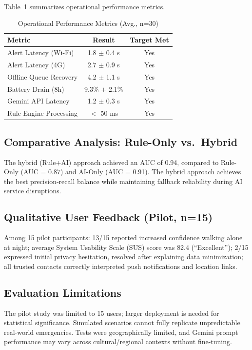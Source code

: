 Table~\ref{tab:performance} summarizes operational performance metrics.

\begin{table}[htbp]
\caption{Operational Performance Metrics (Avg., n=30)}
\label{tab:performance}
\centering
\scriptsize
\begin{tabular}{|l|c|c|}
\hline
\textbf{Metric} & \textbf{Result} & \textbf{Target Met} \\
\hline
Alert Latency (Wi-Fi) & 1.8 $\pm$ 0.4 s & Yes \\
\hline
Alert Latency (4G) & 2.7 $\pm$ 0.9 s & Yes \\
\hline
Offline Queue Recovery & 4.2 $\pm$ 1.1 s & Yes \\
\hline
Battery Drain (8h) & 9.3\% $\pm$ 2.1\% & Yes \\
\hline
Gemini API Latency & 1.2 $\pm$ 0.3 s & Yes \\
\hline
Rule Engine Processing & $<$ 50 ms & Yes \\
\hline
\end{tabular}
\end{table}

\subsection{Comparative Analysis: Rule-Only vs.\ Hybrid}
The hybrid (Rule+AI) approach achieved an AUC of 0.94, compared to Rule-Only (AUC = 0.87) and AI-Only (AUC = 0.91). The hybrid approach achieves the best precision-recall balance while maintaining fallback reliability during AI service disruptions.

\subsection{Qualitative User Feedback (Pilot, n=15)}
Among 15 pilot participants: 13/15 reported increased confidence walking alone at night; average System Usability Scale (SUS) score was 82.4 (``Excellent''); 2/15 expressed initial privacy hesitation, resolved after explaining data minimization; all trusted contacts correctly interpreted push notifications and location links.

\subsection{Evaluation Limitations}
The pilot study was limited to 15 users; larger deployment is needed for statistical significance. Simulated scenarios cannot fully replicate unpredictable real-world emergencies. Tests were geographically limited, and Gemini prompt performance may vary across cultural/regional contexts without fine-tuning.
